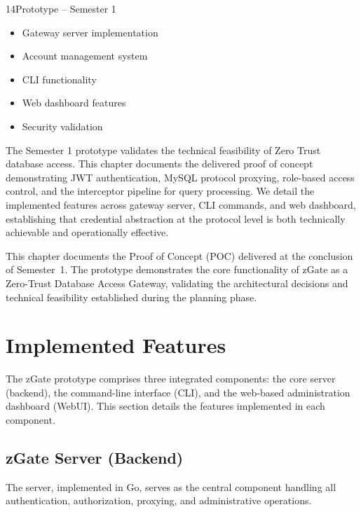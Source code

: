 
\begin{sectionintro}{14}{Prototype – Semester 1}{
  \begin{itemize}[leftmargin=1.5em]
    \item Gateway server implementation
    \item Account management system
    \item CLI functionality
    \item Web dashboard features
    \item Security validation
  \end{itemize}
}
The Semester 1 prototype validates the technical feasibility of Zero Trust database access. This chapter documents the delivered proof of concept demonstrating JWT authentication, MySQL protocol proxying, role-based access control, and the interceptor pipeline for query processing. We detail the implemented features across gateway server, CLI commands, and web dashboard, establishing that credential abstraction at the protocol level is both technically achievable and operationally effective.
\end{sectionintro}

This chapter documents the Proof of Concept (POC) delivered at the conclusion of Semester~1. The prototype demonstrates the core functionality of zGate as a Zero-Trust Database Access Gateway, validating the architectural decisions and technical feasibility established during the planning phase.

\section{Implemented Features}

The zGate prototype comprises three integrated components: the core server (backend), the command-line interface (CLI), and the web-based administration dashboard (WebUI). This section details the features implemented in each component.

\subsection{zGate Server (Backend)}

The server, implemented in Go, serves as the central component handling all authentication, authorization, proxying, and administrative operations.

